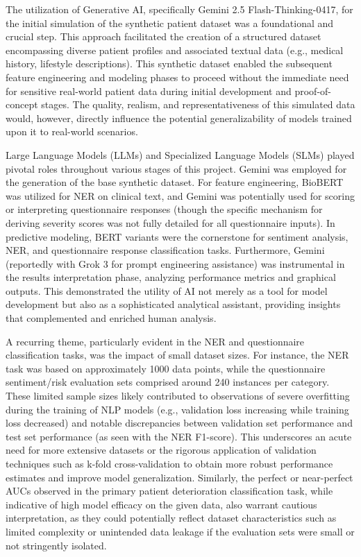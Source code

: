 The utilization of Generative AI, specifically Gemini 2.5 Flash-Thinking-0417, for the initial simulation of the synthetic patient dataset was a foundational and crucial step. This approach facilitated the creation of a structured dataset encompassing diverse patient profiles and associated textual data (e.g., medical history, lifestyle descriptions). This synthetic dataset enabled the subsequent feature engineering and modeling phases to proceed without the immediate need for sensitive real-world patient data during initial development and proof-of-concept stages. The quality, realism, and representativeness of this simulated data would, however, directly influence the potential generalizability of models trained upon it to real-world scenarios.

Large Language Models (LLMs) and Specialized Language Models (SLMs) played pivotal roles throughout various stages of this project. Gemini was employed for the generation of the base synthetic dataset. For feature engineering, BioBERT was utilized for NER on clinical text, and Gemini was potentially used for scoring or interpreting questionnaire responses (though the specific mechanism for deriving severity scores was not fully detailed for all questionnaire inputs). In predictive modeling, BERT variants were the cornerstone for sentiment analysis, NER, and questionnaire response classification tasks. Furthermore, Gemini (reportedly with Grok 3 for prompt engineering assistance) was instrumental in the results interpretation phase, analyzing performance metrics and graphical outputs. This demonstrated the utility of AI not merely as a tool for model development but also as a sophisticated analytical assistant, providing insights that complemented and enriched human analysis.

A recurring theme, particularly evident in the NER and questionnaire classification tasks, was the impact of small dataset sizes. For instance, the NER task was based on approximately 1000 data points, while the questionnaire sentiment/risk evaluation sets comprised around 240 instances per category. These limited sample sizes likely contributed to observations of severe overfitting during the training of NLP models (e.g., validation loss increasing while training loss decreased) and notable discrepancies between validation set performance and test set performance (as seen with the NER F1-score). This underscores an acute need for more extensive datasets or the rigorous application of validation techniques such as k-fold cross-validation to obtain more robust performance estimates and improve model generalization. Similarly, the perfect or near-perfect AUCs observed in the primary patient deterioration classification task, while indicative of high model efficacy on the given data, also warrant cautious interpretation, as they could potentially reflect dataset characteristics such as limited complexity or unintended data leakage if the evaluation sets were small or not stringently isolated.